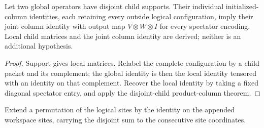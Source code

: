 \begin{lemma}
    \label{thm:mpu_supported_child_columns}
    \leanok
    Let two global operators have disjoint child supports. Their
    individual initialized-column identities, each retaining every
    outside logical configuration, imply their joint column identity
    with output map $V\otimes W\otimes I$ for every spectator encoding.
    Local child matrices and the joint column identity are derived;
    neither is an additional hypothesis.
\end{lemma}
\begin{proof}\leanok
    Support gives local matrices. Relabel the complete configuration
    by a child packet and its complement; the global identity is then
    the local identity tensored with an identity on that complement.
    Recover the local identity by taking a fixed diagonal spectator
    entry, and apply the disjoint-child product-column theorem.
\end{proof}

\begin{definition}
    \label{def:mpu_workspace_fixed_site_permutation}
    \leanok
    Extend a permutation of the logical sites by the identity on
    the appended workspace sites, carrying the disjoint sum to
    the consecutive site coordinates.
\end{definition}

